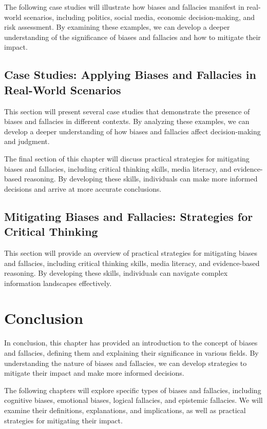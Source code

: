 \documentclass{report}%
\begin{document}
The following case studies will illustrate how biases and fallacies manifest in real-world scenarios, including politics, social media, economic decision-making, and risk assessment. By examining these examples, we can develop a deeper understanding of the significance of biases and fallacies and how to mitigate their impact.

\section{Case Studies: Applying Biases and Fallacies in Real-World Scenarios}

This section will present several case studies that demonstrate the presence of biases and fallacies in different contexts. By analyzing these examples, we can develop a deeper understanding of how biases and fallacies affect decision-making and judgment.

The final section of this chapter will discuss practical strategies for mitigating biases and fallacies, including critical thinking skills, media literacy, and evidence-based reasoning. By developing these skills, individuals can make more informed decisions and arrive at more accurate conclusions.

\section{Mitigating Biases and Fallacies: Strategies for Critical Thinking}

This section will provide an overview of practical strategies for mitigating biases and fallacies, including critical thinking skills, media literacy, and evidence-based reasoning. By developing these skills, individuals can navigate complex information landscapes effectively.

\chapter{Conclusion}

In conclusion, this chapter has provided an introduction to the concept of biases and fallacies, defining them and explaining their significance in various fields. By understanding the nature of biases and fallacies, we can develop strategies to mitigate their impact and make more informed decisions.

The following chapters will explore specific types of biases and fallacies, including cognitive biases, emotional biases, logical fallacies, and epistemic fallacies. We will examine their definitions, explanations, and implications, as well as practical strategies for mitigating their impact.
\end{document}
